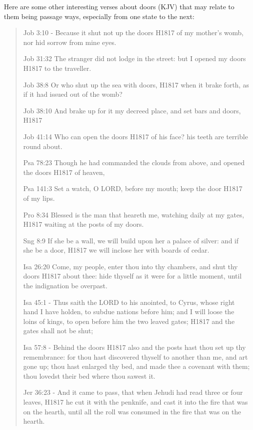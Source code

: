 \documentclass[11pt]{article}
\begin{document}
Here are some other interesting verses about doors (KJV) that may relate to them being passage ways, especially from one state to the next:
\begin{quote}
Job 3:10 - Because it shut not up the doors H1817 of my mother's womb, nor hid sorrow from mine eyes.

Job 31:32
The stranger did not lodge in the street: but I opened my doors H1817 to the traveller.

Job 38:8
Or who shut up the sea with doors, H1817 when it brake forth, as if it had issued out of the womb?

Job 38:10
And brake up for it my decreed place, and set bars and doors, H1817

Job 41:14
Who can open the doors H1817 of his face? his teeth are terrible round about.

Psa 78:23
Though he had commanded the clouds from above, and opened the doors H1817 of heaven,

Psa 141:3 
Set a watch, O LORD, before my mouth; keep the door H1817 of my lips.

Pro 8:34 
Blessed is the man that heareth me, watching daily at my gates, H1817 waiting at the posts of my doors.

Sng 8:9 
If she be a wall, we will build upon her a palace of silver: and if she be a door, H1817 we will inclose her with boards of cedar.


Isa 26:20 
Come, my people, enter thou into thy chambers, and shut thy doors H1817 about thee: hide thyself as it were for a little moment, until the indignation be overpast.


Isa 45:1 - Thus saith the LORD to his anointed, to Cyrus, whose right hand I have holden, to subdue nations before him; and I will loose the loins of kings, to open before him the two leaved gates; H1817 and the gates shall not be shut;

Isa 57:8 - Behind the doors H1817 also and the posts hast thou set up thy remembrance: for thou hast discovered thyself to another than me, and art gone up; thou hast enlarged thy bed, and made thee a covenant with them; thou lovedst their bed where thou sawest it.

Jer 36:23 - And it came to pass, that when Jehudi had read three or four leaves, H1817 he cut it with the penknife, and cast it into the fire that was on the hearth, until all the roll was consumed in the fire that was on the hearth.



\end{quote}
\end{document}
